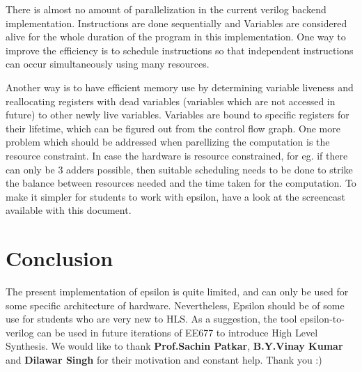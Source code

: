 \documentclass[titlepage]{article}
\begin{document}
        There is almost no amount of parallelization in the current verilog backend implementation. Instructions are done sequentially and Variables are considered alive for the whole duration of the program in this implementation. One way to improve the efficiency is to schedule instructions so that independent instructions can occur simultaneously using many resources. 
        
        Another way is to have efficient memory use by determining variable liveness and reallocating registers with dead variables (variables which are not accessed in future) to other newly live variables. Variables are bound to specific registers for their lifetime, which can be figured out from the control flow graph. One more problem which should be addressed when parellizing the computation is the resource constraint. In case the hardware is resource constrained, for eg. if there can only be 3 adders possible, then suitable scheduling needs to be done to strike the balance between resources needed and the time taken for the computation.
    To make it simpler for students to work with epsilon, have a look at the screencast available with this document.

    \section{Conclusion}
    The present implementation of epsilon is quite limited, and can only be used for some
    specific architecture of hardware. Nevertheless, Epsilon should be of some use for students who are very new to HLS.
    As a suggestion, the tool epsilon-to-verilog can be used in future iterations of EE677 to introduce High Level Synthesis. 
    We would like to thank \textbf{Prof.Sachin Patkar}, \textbf{B.Y.Vinay Kumar} and \textbf{Dilawar Singh} for their motivation and constant help. Thank you :)
\end{document}
